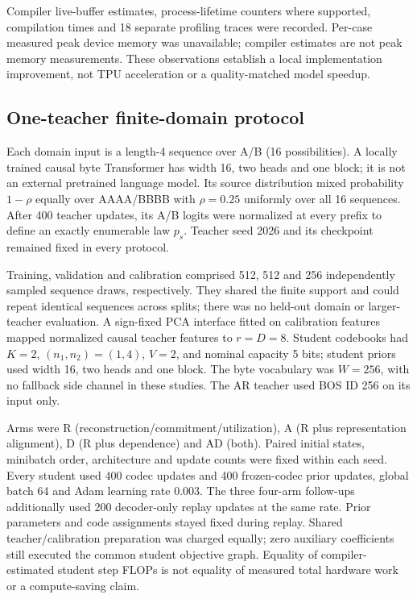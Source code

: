Compiler live-buffer estimates, process-lifetime counters where supported,
compilation times and 18 separate profiling traces were recorded. Per-case
measured peak device memory was unavailable; compiler estimates are not peak
memory measurements. These observations establish a local implementation
improvement, not TPU acceleration or a quality-matched model speedup.

\subsection{One-teacher finite-domain protocol}
\ProtocolSeedsTable
Each domain input is a length-4 sequence over A/B (16 possibilities).
A locally trained causal byte Transformer has width 16, two heads and one block;
it is not an external pretrained language model. Its source distribution mixed
probability \(1-\rho\) equally over AAAA/BBBB with \(\rho=0.25\) uniformly over
all 16 sequences. After 400 teacher updates, its A/B logits were normalized at
every prefix to define an exactly enumerable law \(p_s\).
Teacher seed 2026 and its checkpoint remained fixed in every protocol.

Training, validation and calibration comprised 512, 512 and 256 independently
sampled sequence draws, respectively. They shared the finite support and could
repeat identical sequences across splits; there was no held-out domain or
larger-teacher evaluation. A sign-fixed PCA interface fitted on calibration
features mapped normalized causal teacher features to \(r=D=8\).
Student codebooks had \(K=2\), \((n_1,n_2)=(1,4)\), \(V=2\), and nominal
capacity 5 bits; student priors used width 16, two heads and one block.
The byte vocabulary was \(W=256\), with no fallback side channel in these studies.
The AR teacher used BOS ID 256 on its input only.

Arms were R (reconstruction/commitment/utilization), A (R plus representation
alignment), D (R plus dependence) and AD (both). Paired initial states,
minibatch order, architecture and update counts were fixed within each seed.
Every student used 400 codec updates and 400 frozen-codec prior updates, global
batch 64 and Adam learning rate 0.003. The three four-arm follow-ups additionally
used 200 decoder-only replay updates at the same rate. Prior parameters and code
assignments stayed fixed during replay. Shared teacher/calibration preparation
was charged equally; zero auxiliary coefficients still executed the common
student objective graph. Equality of compiler-estimated student step FLOPs is
not equality of measured total hardware work or a compute-saving claim.

